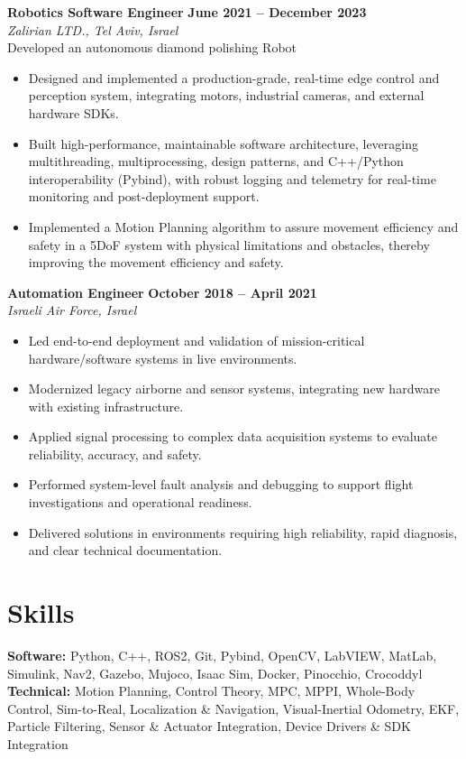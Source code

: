 \documentclass[10pt,letterpaper]{article}
\begin{document}
\vspace{3pt}
\textbf{Robotics Software Engineer} \hfill \textbf{June 2021 – December 2023} \\
\textit{Zalirian LTD., Tel Aviv, Israel}\\
Developed an autonomous diamond polishing Robot
\begin{itemize}[nosep, leftmargin=1.5em, topsep=2pt]
    \item Designed and implemented a production-grade, real-time edge control and perception system, integrating motors, industrial cameras, and external hardware SDKs.
    \item Built high-performance, maintainable software architecture, leveraging multithreading, multiprocessing, design patterns, and C++/Python interoperability (Pybind), with robust logging and telemetry for real-time monitoring and post-deployment support.
    \item Implemented a Motion Planning algorithm to assure movement efficiency and safety in a 5DoF system with physical limitations and obstacles, thereby improving the movement efficiency and safety.
\end{itemize}

\vspace{3pt}
\textbf{Automation Engineer} \hfill \textbf{October 2018 – April 2021} \\
\textit{Israeli Air Force, Israel}
\begin{itemize}[nosep, leftmargin=1.5em, topsep=2pt]
    \item Led end-to-end deployment and validation of mission-critical hardware/software systems in live environments.
    \item Modernized legacy airborne and sensor systems, integrating new hardware with existing infrastructure.
    \item Applied signal processing to complex data acquisition systems to evaluate reliability, accuracy, and safety.
    \item Performed system-level fault analysis and debugging to support flight investigations and operational readiness.
    \item Delivered solutions in environments requiring high reliability, rapid diagnosis, and clear technical documentation.
\end{itemize}

\section{Skills}
\textbf{Software:} Python, C++, ROS2, Git, Pybind, OpenCV, LabVIEW, MatLab, Simulink, Nav2, Gazebo, Mujoco, Isaac Sim, Docker, Pinocchio, Crocoddyl \\
\textbf{Technical:} Motion Planning, Control Theory, MPC, MPPI, Whole-Body Control, Sim-to-Real, Localization \& Navigation, Visual-Inertial Odometry, EKF, Particle Filtering, Sensor \& Actuator Integration, Device Drivers \& SDK Integration
\end{document}
